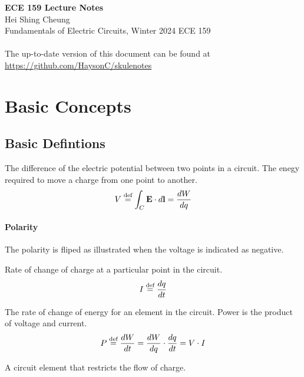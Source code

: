 \documentclass[11pt]{article}
\begin{document}
\thispagestyle{empty}
{\LARGE \bf ECE 159 Lecture Notes}\\
{\large Hei Shing Cheung}\\
Fundamentals of Electric Circuits, Winter 2024 \hfill ECE 159\\
\\
The up-to-date version of this document can be found at \url{https://github.com/HaysonC/skulenotes}\\
\vspace{10pt}
\section{Basic Concepts}
\subsection{Basic Defintions}
\begin{definition}[Voltage]
    The difference of the electric potential between two points in a circuit. The enegy required to move a charge from one point to another.
    \begin{equation}
        V \stackrel{\text{def}}{=} \int_C \textbf{E} \cdot d\textbf{l} = \frac{dW}{dq}
    \end{equation}
    \end{definition}
    \paragraph{Polarity} The polarity is fliped as illustrated when the voltage is indicated as negative.
    \begin{definition}[Current]
    Rate of change of charge at a particular point in the circuit.
    \begin{equation}
        I \stackrel{\text{def}}{=} \frac{dq}{dt}
    \end{equation}
    \end{definition}
    
    \begin{definition}[Power]
    The rate of change of energy for an element in the circuit. Power is the product of voltage and current.
    \begin{equation}
        P \stackrel{\text{def}}{=} \frac{dW}{dt} = \frac{dW}{dq} \cdot \frac{dq}{dt} = V \cdot I
    \end{equation}
    \end{definition}
    
    \begin{definition}[Resistors]
    A circuit element that restricts the flow of charge.
    \end{definition}
    
\end{document}
